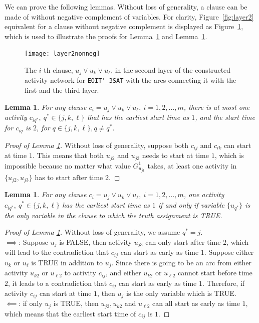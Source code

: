 \documentclass[11pt]{article}
\newtheorem{lemma}[theorem]{Lemma}
\begin{document}
	We can prove the following lemmas. Without loss of generality, a clause can be made of without negative complement of variables. For clarity, Figure~\ref{fig:layer2} equivalent for a clause without negative complement is displayed as Figure~\ref{fig:layer2nonneg}, which is used to illustrate the proofs for Lemma~\ref{lemma:onlyOne} and Lemma~\ref{lemma:iff}.
	\begin{figure}[H]
		\centering
		\texttt{[image: layer2nonneg]}
		\caption{The \(i\)-th clause, \(u_{j} \vee u_{k} \vee u_{\ell}\), in the second layer of the constructed activity network for \texttt{EOIT\char`_3SAT} with the arcs connecting it with the first and the third layer.}
		\label{fig:layer2nonneg}
	\end{figure}
	\begin{lemma} \label{lemma:onlyOne}
		For any clause \(c_i = u_j \vee u_k \vee u_\ell,\ i = 1,2,\dots,m\), there is at most one activity \(c_{iq^*},\ q^* \in \{j,k,\ell\}\) that has the earliest start time as \(1\), and the start time for \(c_{iq}\) is \(2\), for \(q \in \{j,k,\ell\}, q \neq q^*\).
	\end{lemma}
	\begin{proof}[Proof of Lemma \ref{lemma:onlyOne}]
		Without loss of generality, suppose both \(c_{ij}\) and \(c_{ik}\) can start at time \(1\). This means that both \(u_{j2}\) and \(u_{j3}\) needs to start at time \(1\), which is impossible because no matter what value \(G^1_{u_{j1}}\) takes, at least one activity in \(\{u_{j2},u_{j3}\}\) has to start after time \(2\).
	\end{proof}
	\begin{lemma} \label{lemma:iff}
		For any clause \(c_i = u_j \vee u_k \vee u_\ell,\ i = 1,2,\dots,m\), one activity \(c_{iq^*},\ q^* \in \{j,k,\ell\}\) has the earliest start time as \(1\) if and only if variable \(\{u_{q^*}\}\) is the only variable in the clause to which the truth assignment is TRUE.
	\end{lemma}
	\begin{proof}[Proof of Lemma \ref{lemma:iff}]
		Without loss of generality, we assume \(q^* = j\).\\
		\(\implies\):  Suppose \(u_j\) is FALSE, then activity \(u_{j3}\) can only start after time \(2\), which will lead to the contradiction that \(c_{ij}\) can start as early as time \(1\). Suppose either \(u_k\) or \(u_\ell\) is TRUE in addition to \(u_j\). Since there is going to be an arc from either activity \(u_{k2}\) or \(u_{\ell 2}\) to activity \(c_{ij}\), and either \(u_{k2}\) or \(u_{\ell 2}\) cannot start before time \(2\), it leads to a contradiction that \(c_{ij}\) can start as early as time \(1\). Therefore, if activity \(c_{ij}\) can start at time \(1\), then \(u_j\) is the only variable which is TRUE.\\
		\(\impliedby\): if only \(u_j\) is TRUE, then \(u_{j3}, u_{k2}\) and \(u_{\ell 2}\) can all start as early as time \(1\), which means that the earliest start time of \(c_{ij}\) is \(1\).
	\end{proof}
\end{document}
